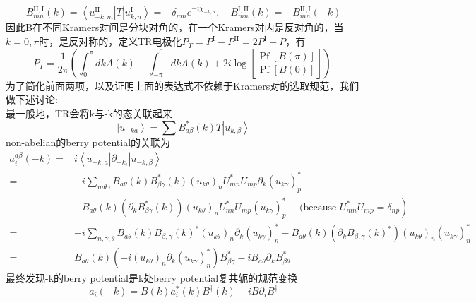 \documentclass[10pt,openany]{book}
\theoremstyle{thmstyle} %
\theoremstyle{defstyle} %
\theoremstyle{prostyle} %
\begin{document}
\begin{equation}
  B_{m n}^{\mathrm{II}, \mathrm{I}}(k)=\left\langle u_{-k, m}^{\mathrm{II}}\right| T\left|u_{k, n}^{\mathrm{I}}\right\rangle=-\delta_{m n} e^{-i \chi_{-k, n}}, \quad B_{m n}^{\mathrm{I}, \mathrm{II}}(k)=-B_{m n}^{\mathrm{II}, \mathrm{I}}(-k)
\end{equation}
因此B在不同Kramers对间是分块对角的，在一个Kramers对内是反对角的，当$k=0,\pi$时，是反对称的，定义TR电极化$P_T=P^{\mathrm{I}}-P^{\mathrm{II}}=2 P^{\mathrm{I}}-P$，有
\begin{equation}
  P_T=\frac{1}{2 \pi}\left(\int_0^\pi d k A(k)-\int_{-\pi}^0 d k A(k)+2 i \log \left[\frac{\operatorname{Pf}[B(\pi)]}{\operatorname{Pf}[B(0)]}\right]\right) .
\end{equation}
为了简化前面两项，以及证明上面的表达式不依赖于Kramers对的选取规范，我们做下述讨论:\\
最一般地，TR会将k与-k的态关联起来
\begin{equation*}
  \left|u_{-k a}\right\rangle=\sum B_{a \beta}^*(k) T\left|u_{k, \beta}\right\rangle
\end{equation*}
non-abelian的berry potential的关联为
\begin{equation}
  \begin{aligned}
    a_i^{a \beta}(-k)= & i\left\langle u_{-k, a}\right| \partial_{-k_i}\left|u_{-k, \beta}\right\rangle \\
    = & -i \sum_{m \theta \gamma} B_{a \theta}(k) B_{\beta \gamma}^*(k)\left(u_{k \theta}\right)_n U_{m n}^* U_{m p} \partial_k\left(u_{k \gamma}\right)_p^* \\
    & \left.+B_{a \theta}(k)\left(\partial_k B_{\beta \gamma}^*(k)\right)\left(u_{k \theta}\right)_n U_{n n}^* U_{m p}\left(u_{k \gamma}\right)_p^* \quad \text { (because } U_{m n}^* U_{m p}=\delta_{n p}\right) \\
    = & -i \sum_{n, \gamma, \theta} B_{a \theta}(k) B_{\beta, \gamma}(k)^*\left(u_{k \theta}\right)_n \partial_k\left(u_{k \gamma}\right)_n^*-B_{a \theta}(k)\left(\partial_k B_{\beta, \gamma}(k)^*\right)\left(u_{k \theta}\right)_n\left(u_{k \gamma}\right)_n^* \\
    = & B_{a \theta}(k)\left(-i\left(u_{k \theta}\right)_n \partial_k\left(u_{k \gamma}\right)_n^*\right) B_{\beta \gamma}^*-i B_{a \theta} \partial_k B_{\beta \theta}^*
    \end{aligned}
\end{equation}
最终发现-k的berry potential是k处berry potential复共轭的规范变换
\begin{equation*}
  a_i(-k)=B(k) a_i^*(k) B^{\dagger}(k)-i B \partial_i B^{\dagger}
\end{equation*}
\end{document}
